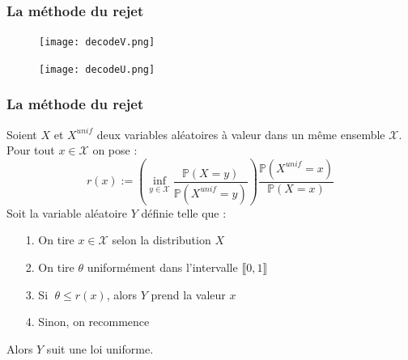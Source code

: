 \documentclass[10pt,a4paper]{beamer}
\theoremstyle{plain}
\theoremstyle{definition}
\begin{document}
\begin{frame}
\frametitle{La méthode du rejet}
\begin{figure}[h]
\begin{center}
\texttt{[image: decodeV.png]}
\end{center}
\end{figure}

\vspace{-0.1in}

\begin{figure}[h]
\begin{center}
\texttt{[image: decodeU.png]}
\end{center}
\end{figure}
\end{frame}

\begin{frame}
\frametitle{La méthode du rejet}
Soient $X$ et $X^{unif}$ deux variables aléatoires à valeur dans un même ensemble $\mathcal{X}$.
Pour tout $x \in \mathcal{X}$ on pose :
\begin{equation*}
    r(x) := \left(\inf\limits_{y \in \mathcal{X}}\frac{\mathbb{P}(X=y)}{\mathbb{P}(X^{unif}=y)}\right) \frac{\mathbb{P}(X^{unif}=x)}{\mathbb{P}(X=x)}
\end{equation*}
\vspace{0.2in}
Soit la variable aléatoire $Y$ définie telle que :
\begin{enumerate}
\item[1.] On tire $x \in \mathcal{X}$ selon la distribution $X$
\vspace{0.1in}
\item[2.] On tire $\theta$ uniformément dans l'intervalle $\llbracket 0,1 \rrbracket$
\vspace{0.1in}
\item[3.] Si $\;\theta \leq r(x)$, alors $Y$ prend la valeur $x$
\vspace{0.1in}
\item[4.] Sinon, on recommence
\end{enumerate}
\vspace{0.2in}
Alors $Y$ suit une loi uniforme. 

\end{frame}
\end{document}
